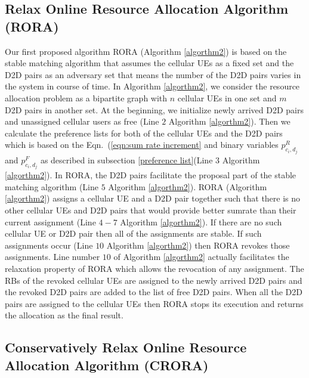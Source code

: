 \documentclass[times]{dacauth}
\begin{document}
\subsection{Relax Online Resource Allocation Algorithm (RORA)}

\medskip
\noindent
Our first proposed algorithm RORA (Algorithm \ref{algorthm2}) is based on the stable matching algorithm \cite{knuth1976mariages} that assumes the cellular UEs as a fixed set and the D2D pairs as an adversary set that means the number of the D2D pairs varies in the system in course of time. In Algorithm \ref{algorthm2}, we consider the resource allocation problem as a bipartite graph with $n$ cellular UEs in one set and $m$ D2D pairs in another set. At the beginning, we initialize newly arrived D2D pairs and unassigned cellular users as free (Line $2$ Algorithm \ref{algorthm2}). 
Then we calculate the preference lists for both of the cellular UEs and the D2D pairs which is based on the Eqn.~(\ref{eqn:sum rate increment} and binary variables $p_{c_i,d_j}^{R}$ and $p_{c_i,d_j}^{F}$ as described in subsection \ref{preference list}(Line $3$ Algorithm \ref{algorthm2}). In RORA, the D2D pairs facilitate the proposal part of the stable matching algorithm (Line $5$ Algorithm \ref{algorthm2}). RORA (Algorithm \ref{algorthm2}) assigns a cellular UE and a D2D pair together such that there is no other cellular UEs and D2D pairs that would provide better sumrate than their current assignment (Line $4-7$ Algorithm \ref{algorthm2}). If there are no such cellular UE or D2D pair then all of the assignments are stable. If such assignments occur (Line $10$  Algorithm \ref{algorthm2}) then RORA revokes those assignments. Line number $10$ of Algorithm \ref{algorthm2} actually facilitates the relaxation property of RORA which allows the revocation of any assignment. The RBs of the revoked cellular UEs are assigned to the newly arrived D2D pairs and the revoked D2D pairs are added to the list of free D2D pairs. When all the D2D pairs are assigned to the cellular UEs then RORA stops its execution and returns the allocation as the final result. 
 
 
\subsection{Conservatively Relax Online Resource Allocation Algorithm (CRORA)}
 
\end{document}

